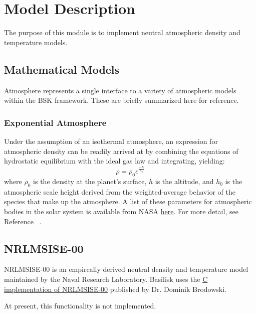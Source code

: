 
\section{Model Description}

The purpose of this module is to implement neutral atmospheric density and temperature models.


\subsection{Mathematical Models}
Atmosphere represents a single interface to a variety of atmospheric models within the BSK framework. These are briefly summarized here for reference.

\subsubsection{Exponential Atmosphere}
Under the assumption of an isothermal atmosphere, an expression for atmospheric density can be readily arrived at by combining the equations of hydrostatic equilibrium with the ideal gas law and integrating, yielding:
\begin{equation}
\label{eq:expAtmo}
\rho = \rho_0 e^{\frac{-h}{h_0}}
\end{equation}
where $\rho_0$ is the density at the planet's surface, $h$ is the altitude, and $h_0$ is the atmospheric scale height derived from the weighted-average behavior of the species that make up the atmosphere. A list of these parameters
for atmospheric bodies in the solar system is available from NASA \href{https://nssdc.gsfc.nasa.gov/planetary/planetfact.html}{here}. For more detail, see Reference ~\cite{vallado2013}. 

\subsection{NRLMSISE-00}
NRLMSISE-00 is an empircally derived neutral density and temperature model maintained by the Naval Research Laboratory. Basilisk uses the \href{https://www.brodo.de/space/nrlmsise/index.html}{C implementation of NRLMSISE-00} published by Dr. Dominik Brodowski.

At present, this functionality is not implemented.